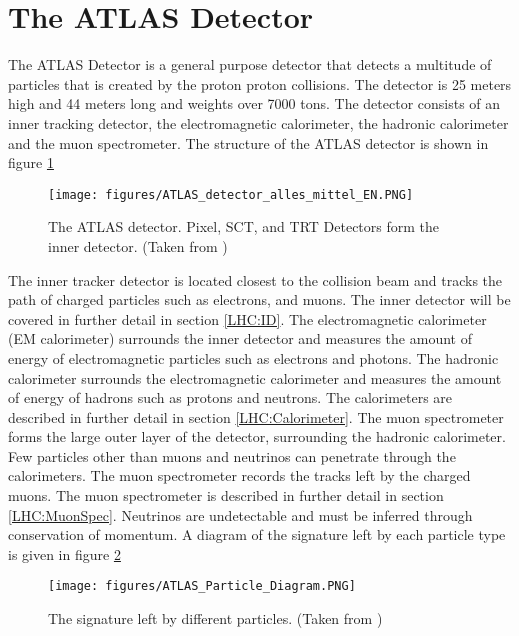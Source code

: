 \section{The ATLAS Detector}
\label{LHC:detector}
\indent The ATLAS Detector is a general purpose detector that detects a multitude of particles that is created by the proton proton collisions. The detector is 25 meters high and 44 meters long and weights over 7000 tons.\cite{biblio:JINST} The detector consists of an inner tracking detector, the electromagnetic calorimeter, the hadronic calorimeter and the muon spectrometer. The structure of the ATLAS detector is shown in figure \ref{LHC:fig:ATLASDet} ~\\
\begin{figure}[h!]
\centering
\texttt{[image: figures/ATLAS\_detector\_alles\_mittel\_EN.PNG]}
\caption{ The ATLAS detector. Pixel, SCT, and TRT Detectors form the inner detector.  (Taken from \cite{biblio:JINST}) \label{LHC:fig:ATLASDet}}
\end{figure}

\indent The inner tracker detector is located closest to the collision beam and tracks the path of charged particles such as electrons, and muons. The inner detector will be covered in further detail in section \ref{LHC:ID}. The electromagnetic calorimeter (EM calorimeter) surrounds the inner detector and measures the amount of energy of electromagnetic particles such as electrons and photons. The hadronic calorimeter surrounds the electromagnetic calorimeter and measures the amount of energy of hadrons such as protons and neutrons. The calorimeters are described in further detail in section \ref{LHC:Calorimeter}. The muon spectrometer forms the large outer layer of the detector, surrounding the hadronic calorimeter. Few particles other than muons and neutrinos can penetrate through the calorimeters. The muon spectrometer records the tracks left by the charged muons. The muon spectrometer is described in further detail in section \ref{LHC:MuonSpec}. Neutrinos are undetectable and must be inferred through conservation of momentum. A diagram of the signature left by each particle type is given in figure \ref{LHC:fig:ATLASParticleDiagram} ~\\
\begin{figure}[h!]
\centering
\texttt{[image: figures/ATLAS\_Particle\_Diagram.PNG]}
\caption{ The signature left by different particles. (Taken from \cite{biblio:SMcourse}) \label{LHC:fig:ATLASParticleDiagram}}
\end{figure}

